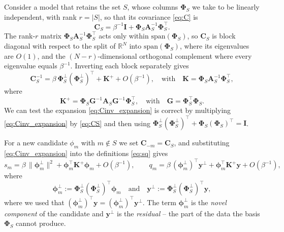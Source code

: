 \documentclass[a4paper]{article}
\renewcommand{\vec}[1]{\boldsymbol{#1}}
\begin{document}
Consider a model that retains the set $S$, whose columns $\mathbf \Phi_S$ we take to be linearly independent, with rank $r = |S|$, so that its covariance \eqref{eq:C} is
\begin{equation} \label{eq:CS}
    \mathbf C_S = \beta^{-1} \mathbf I + \mathbf \Phi_S \mathbf A_S^{-1} \mathbf \Phi_S^\top.
\end{equation}
The rank-$r$ matrix $\mathbf \Phi_S \mathbf A_S^{-1} \mathbf \Phi_S^\top$ acts only within $\mathrm{span}(\mathbf \Phi_S)$, so $\mathbf C_S$ is block diagonal with respect to the split of $\mathbb R^N$ into $\mathrm{span}(\mathbf \Phi_S)$, where its eigenvalues are $O(1)$, and the $(N-r)$-dimensional orthogonal complement where every eigenvalue equals $\beta^{-1}$. Inverting each block separately gives
\begin{equation} \label{eq:Cinv_expansion}
    \mathbf C_S^{-1} = \beta \, \mathbf \Phi_S^\perp (\mathbf \Phi_S^\perp)^\top + \mathbf K^{\!+} + O(\beta^{-1}), \quad \text{with} \quad \mathbf K =  \mathbf \Phi_S \mathbf A_S^{-1} \mathbf \Phi_S^\top,
\end{equation}
where 
\[
\mathbf K^{\!+} = \mathbf \Phi_S \mathbf G^{-1} \mathbf A_S \mathbf G^{-1} \mathbf \Phi_S^\top,
\quad \text{with} \quad \mathbf G = \mathbf \Phi_S^\top \mathbf \Phi_S.
\]
We can test the expansion \eqref{eq:Cinv_expansion} is correct by multiplying \eqref{eq:Cinv_expansion} by \eqref{eq:CS} and then using $\mathbf \Phi_S^\perp (\mathbf \Phi_S^\perp)^\top + \mathbf \Phi_S (\mathbf \Phi_S)^\top = \mathbf I$.

For a new candidate $\phi_m$ with $m \notin S$ we set $\mathbf C_{-m} = \mathbf C_S$, and substituting \eqref{eq:Cinv_expansion} into the definitions \eqref{eq:sq} gives
\begin{equation} \label{eq:sq_low_noise}
    s_m = \beta \, \|\vec \phi_m^\perp\|^2 + \vec \phi_m^\top \mathbf K^{\!+} \vec \phi_m  +  O(\beta^{-1}),
    \qquad
    q_m = \beta \, (\vec \phi_m^\perp)^\top \mathbf y^\perp + \vec \phi_m^\top \mathbf K^{\!+} \vec y  +  O(\beta^{-1}),
\end{equation}
where
\[
\vec \phi_m^\perp := \mathbf \Phi_S^\perp (\mathbf \Phi_S^\perp)^\top \vec \phi_m 
\quad \text{and} \quad 
\mathbf y^\perp := \mathbf \Phi_S^\perp (\mathbf \Phi_S^\perp)^\top \mathbf y,
\]
where we used that $(\vec \phi_m^\perp)^\top \mathbf y = (\vec \phi_m^\perp)^\top \mathbf y^\perp$. The term $\vec \phi_m^\perp$ is the \emph{novel component} of the candidate and $\mathbf y^\perp$ is the \emph{residual} -- the part of the data the basis $\mathbf \Phi_S$ cannot produce. 
\end{document}
